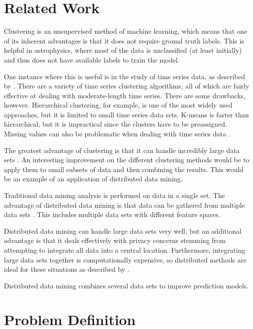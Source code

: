 \documentclass[12pt]{article}
\begin{document}

\section{Related Work} %
\label{sec:Related Work}
Clustering is an unsupervised method of machine learning, which means that one of its inherent advantages is that it does not require ground truth labels.
This is helpful in astrophysics, where most of the data is unclassified (at least initially) and thus does not have available labels to train the model.

One instance where this is useful is in the study of time series data, as described by \cite{wang}.
There are a variety of time series clustering algorithms, all of which are fairly effective at dealing with moderate-length time series.
There are some drawbacks, however.
Hierarchical clustering, for example, is one of the most widely used approaches, but it is limited to small time series data sets.
K-means is faster than hierarchical, but it is impractical since the clusters have to be preassigned.
Missing values can also be problematic when dealing with time series data \citep{wang}. 

The greatest advantage of clustering is that it can handle incredibly large data sets \citep{januzaj}.
An interesting improvement on the different clustering methods would be to apply them to small subsets of data and then combining the results. 
This would be an example of an application of distributed data mining.

Traditional data mining analysis is performed on data in a single set.
The advantage of distributed data mining is that data can be gathered from multiple data sets \citep{McConnell}.
This includes multiple data sets with different feature spaces.

Distributed data mining can handle large data sets very well, but an additional advantage is that it deals effectively with privacy concerns stemming from attempting to integrate all data into a central location. Furthermore, integrating large data sets together is computationally expensive, so distributed methods are ideal for these situations as described by \cite{McConnell2}. 

Distributed data mining combines several data sets to improve prediction models. 


\section{Problem Definition} %
\label{sec:Problem Definition}
\end{document}
